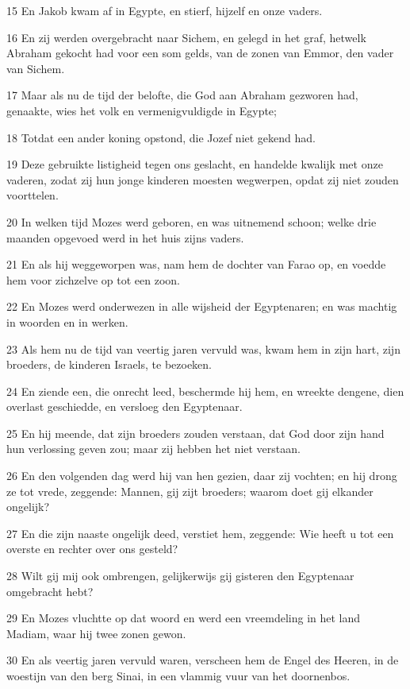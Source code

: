 \par 15 En Jakob kwam af in Egypte, en stierf, hijzelf en onze vaders.
\par 16 En zij werden overgebracht naar Sichem, en gelegd in het graf, hetwelk Abraham gekocht had voor een som gelds, van de zonen van Emmor, den vader van Sichem.
\par 17 Maar als nu de tijd der belofte, die God aan Abraham gezworen had, genaakte, wies het volk en vermenigvuldigde in Egypte;
\par 18 Totdat een ander koning opstond, die Jozef niet gekend had.
\par 19 Deze gebruikte listigheid tegen ons geslacht, en handelde kwalijk met onze vaderen, zodat zij hun jonge kinderen moesten wegwerpen, opdat zij niet zouden voorttelen.
\par 20 In welken tijd Mozes werd geboren, en was uitnemend schoon; welke drie maanden opgevoed werd in het huis zijns vaders.
\par 21 En als hij weggeworpen was, nam hem de dochter van Farao op, en voedde hem voor zichzelve op tot een zoon.
\par 22 En Mozes werd onderwezen in alle wijsheid der Egyptenaren; en was machtig in woorden en in werken.
\par 23 Als hem nu de tijd van veertig jaren vervuld was, kwam hem in zijn hart, zijn broeders, de kinderen Israels, te bezoeken.
\par 24 En ziende een, die onrecht leed, beschermde hij hem, en wreekte dengene, dien overlast geschiedde, en versloeg den Egyptenaar.
\par 25 En hij meende, dat zijn broeders zouden verstaan, dat God door zijn hand hun verlossing geven zou; maar zij hebben het niet verstaan.
\par 26 En den volgenden dag werd hij van hen gezien, daar zij vochten; en hij drong ze tot vrede, zeggende: Mannen, gij zijt broeders; waarom doet gij elkander ongelijk?
\par 27 En die zijn naaste ongelijk deed, verstiet hem, zeggende: Wie heeft u tot een overste en rechter over ons gesteld?
\par 28 Wilt gij mij ook ombrengen, gelijkerwijs gij gisteren den Egyptenaar omgebracht hebt?
\par 29 En Mozes vluchtte op dat woord en werd een vreemdeling in het land Madiam, waar hij twee zonen gewon.
\par 30 En als veertig jaren vervuld waren, verscheen hem de Engel des Heeren, in de woestijn van den berg Sinai, in een vlammig vuur van het doornenbos.
